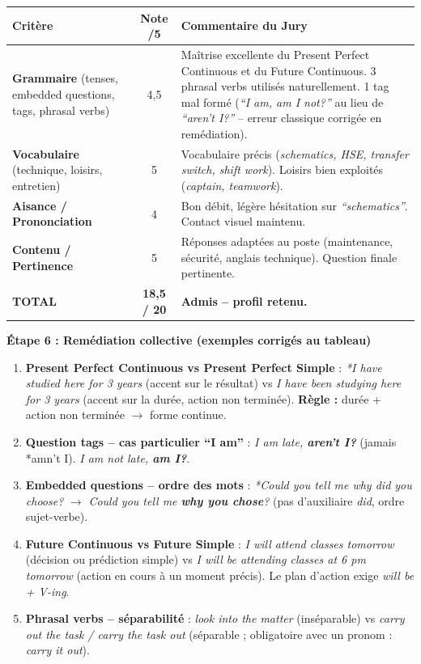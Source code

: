 \documentclass[11pt]{article}
\begin{document}
\begin{center}
\begin{tabularx}{\linewidth}{|X|c|X|}\hline
\rowcolor{popblueL}
\textbf{Critère} & \textbf{Note /5} & \textbf{Commentaire du Jury} \\ \hline
\textbf{Grammaire} (tenses, embedded questions, tags, phrasal verbs) & 4,5 & Maîtrise excellente du Present Perfect Continuous et du Future Continuous. 3 phrasal verbs utilisés naturellement. 1 tag mal formé (\emph{``I am, am I not?''} au lieu de \emph{``aren't I?''} -- erreur classique corrigée en remédiation). \\ \hline
\textbf{Vocabulaire} (technique, loisirs, entretien) & 5 & Vocabulaire précis (\emph{schematics, HSE, transfer switch, shift work}). Loisirs bien exploités (\emph{captain, teamwork}). \\ \hline
\textbf{Aisance / Prononciation} & 4 & Bon débit, légère hésitation sur \emph{``schematics''}. Contact visuel maintenu. \\ \hline
\textbf{Contenu / Pertinence} & 5 & Réponses adaptées au poste (maintenance, sécurité, anglais technique). Question finale pertinente. \\ \hline
\textbf{TOTAL} & \textbf{18,5 / 20} & \textbf{Admis -- profil retenu.} \\ \hline
\end{tabularx}
\end{center}

\textbf{Étape 6 : Remédiation collective (exemples corrigés au tableau)}

\begin{attention}
\begin{enumerate}
    \item \textbf{Present Perfect Continuous vs Present Perfect Simple} : \emph{*I have studied here for 3 years} (accent sur le résultat) vs \emph{I have been studying here for 3 years} (accent sur la durée, action non terminée). \textbf{Règle :} durée + action non terminée $\rightarrow$ forme continue.
    \item \textbf{Question tags -- cas particulier ``I am''} : \emph{I am late, \textbf{aren't I?}} (jamais *amn't I). \emph{I am not late, \textbf{am I?}}.
    \item \textbf{Embedded questions -- ordre des mots} : \emph{*Could you tell me why did you choose?} $\rightarrow$ \emph{Could you tell me \textbf{why you chose}?} (pas d'auxiliaire \emph{did}, ordre sujet-verbe).
    \item \textbf{Future Continuous vs Future Simple} : \emph{I will attend classes tomorrow} (décision ou prédiction simple) vs \emph{I will be attending classes at 6 pm tomorrow} (action en cours à un moment précis). Le plan d'action exige \emph{will be + V-ing}.
    \item \textbf{Phrasal verbs -- séparabilité} : \emph{look into the matter} (inséparable) vs \emph{carry out the task / carry the task out} (séparable ; obligatoire avec un pronom : \emph{carry it out}).
\end{enumerate}
\end{attention}
\end{document}
